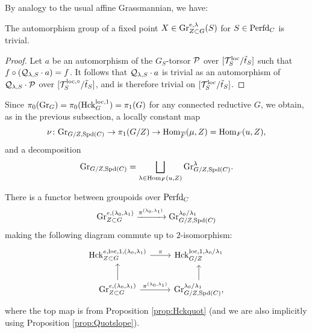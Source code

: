 By analogy to the usual affine Grassmannian, we have:
\begin{lem}\label{lem:Grrig}
    The automorphism group of a fixed point $X \in \textnormal{Gr}_{Z \subset G}^{e,\lambda}(S)$ for $S \in \mathrm{Perfd}_{C}$ is trivial.
\end{lem}

\begin{proof}
    Let $a$ be an automorphism of the $G_{S}$-torsor $\mathcal{P}$ over $[\mathcal{T}_{S}^{\mathrm{loc}}/\tilde{t}_{S}]$ such that $f \circ (\mathcal{Q}_{\lambda,S} \cdot a)  = f$. It follows that  $\mathcal{Q}_{\lambda,S} \cdot a$ is trivial as an automorphism of $\mathcal{Q}_{\lambda,S} \cdot \mathcal{P}$ over $[\mathcal{T}_{S}^{\mathrm{loc},\circ}/\tilde{t}_{S}]$, and is therefore trivial on $[\mathcal{T}_{S}^{\mathrm{loc}}/\tilde{t}_{S}]$.
\end{proof}

Since $\pi_{0}(\textnormal{Gr}_{G}) = \pi_{0}(\mathrm{Hck}_{G}^{\mathrm{loc},1}) = \pi_{1}(G)$ for any connected reductive $G$, we obtain, as in the previous subsection, a locally constant map
\begin{equation*}
\nu \colon \textnormal{Gr}_{G/Z,\mathrm{Spd}(C)} \to \pi_{1}(G/Z) \to \mathrm{Hom}_{\overline{F}}(\mu,Z) = \mathrm{Hom}_{F}(u,Z),
\end{equation*}
and a decomposition 
\begin{equation*}
  \textnormal{Gr}_{G/Z,\mathrm{Spd}(C)}   = \bigsqcup_{\lambda \in \mathrm{Hom}_{F}(u,Z)} \textnormal{Gr}_{G/Z,\mathrm{Spd}(C)}^{\lambda}.
\end{equation*}

\begin{prop}\label{prop:Grquot}
    There is a functor between groupoids over $\mathrm{Perfd}_{C}$
    \begin{equation*}
\textnormal{Gr}_{Z \subset G}^{e,(\lambda_{0},\lambda_{1})} \xrightarrow{\pi^{(\lambda_{0},\lambda_{1})}} \textnormal{Gr}_{G/Z,\mathrm{Spd}(C)}^{\lambda_{0}/\lambda_{1}}
    \end{equation*}
    making the following diagram commute up to $2$-isomorphism:
\[
\begin{tikzcd}
    \Hck_{Z \subset G}^{e,\loc,1,(\lambda_{0},\lambda_{1})} \arrow["\pi"]{r} & \Hck_{G/Z}^{\loc,1,\lambda_{0}/\lambda_{1}} \\
    \tn{Gr}_{Z \subset G}^{e,(\lambda_{0},\lambda_{1})} \arrow{u} \arrow["\pi^{(\lambda_{0},\lambda_{1})}"]{r} & \tn{Gr}_{G/Z,\Spd(C)}^{\lambda_{0}/\lambda_{1}} \arrow{u},
\end{tikzcd}
    \]
    where the top map is from Proposition \ref{prop:Hckquot} (and we are also implicitly using Proposition \ref{prop:Quotslope}).
\end{prop}

